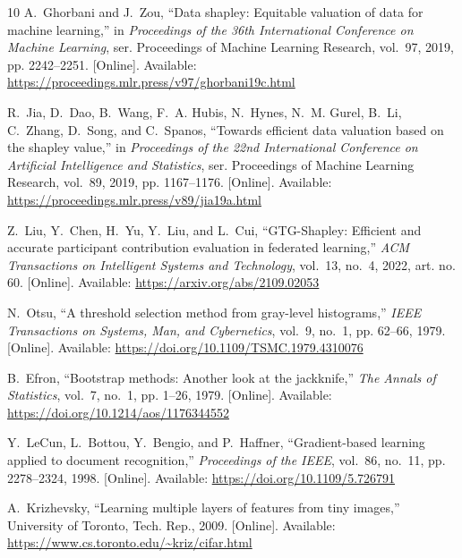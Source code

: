\documentclass[conference]{IEEEtran}
\begin{document}
\begin{thebibliography}{10}
\BIBentryALTinterwordspacing
A.~Ghorbani and J.~Zou, ``Data shapley: Equitable valuation of data for machine
  learning,'' in \emph{Proceedings of the 36th International Conference on
  Machine Learning}, ser. Proceedings of Machine Learning Research, vol.~97,
  2019, pp. 2242--2251. [Online]. Available:
  \url{https://proceedings.mlr.press/v97/ghorbani19c.html}
\BIBentrySTDinterwordspacing

\BIBentryALTinterwordspacing
R.~Jia, D.~Dao, B.~Wang, F.~A. Hubis, N.~Hynes, N.~M. Gurel, B.~Li, C.~Zhang,
  D.~Song, and C.~Spanos, ``Towards efficient data valuation based on the
  shapley value,'' in \emph{Proceedings of the 22nd International Conference on
  Artificial Intelligence and Statistics}, ser. Proceedings of Machine Learning
  Research, vol.~89, 2019, pp. 1167--1176. [Online]. Available:
  \url{https://proceedings.mlr.press/v89/jia19a.html}
\BIBentrySTDinterwordspacing

\BIBentryALTinterwordspacing
Z.~Liu, Y.~Chen, H.~Yu, Y.~Liu, and L.~Cui, ``{GTG-Shapley}: Efficient and
  accurate participant contribution evaluation in federated learning,''
  \emph{ACM Transactions on Intelligent Systems and Technology}, vol.~13,
  no.~4, 2022, art. no. 60. [Online]. Available:
  \url{https://arxiv.org/abs/2109.02053}
\BIBentrySTDinterwordspacing

\BIBentryALTinterwordspacing
N.~Otsu, ``A threshold selection method from gray-level histograms,''
  \emph{IEEE Transactions on Systems, Man, and Cybernetics}, vol.~9, no.~1, pp.
  62--66, 1979. [Online]. Available:
  \url{https://doi.org/10.1109/TSMC.1979.4310076}
\BIBentrySTDinterwordspacing

\BIBentryALTinterwordspacing
B.~Efron, ``Bootstrap methods: Another look at the jackknife,'' \emph{The
  Annals of Statistics}, vol.~7, no.~1, pp. 1--26, 1979. [Online]. Available:
  \url{https://doi.org/10.1214/aos/1176344552}
\BIBentrySTDinterwordspacing

\BIBentryALTinterwordspacing
Y.~LeCun, L.~Bottou, Y.~Bengio, and P.~Haffner, ``Gradient-based learning
  applied to document recognition,'' \emph{Proceedings of the IEEE}, vol.~86,
  no.~11, pp. 2278--2324, 1998. [Online]. Available:
  \url{https://doi.org/10.1109/5.726791}
\BIBentrySTDinterwordspacing

\BIBentryALTinterwordspacing
A.~Krizhevsky, ``Learning multiple layers of features from tiny images,''
  University of Toronto, Tech. Rep., 2009. [Online]. Available:
  \url{https://www.cs.toronto.edu/~kriz/cifar.html}
\BIBentrySTDinterwordspacing


\end{thebibliography}
\end{document}
